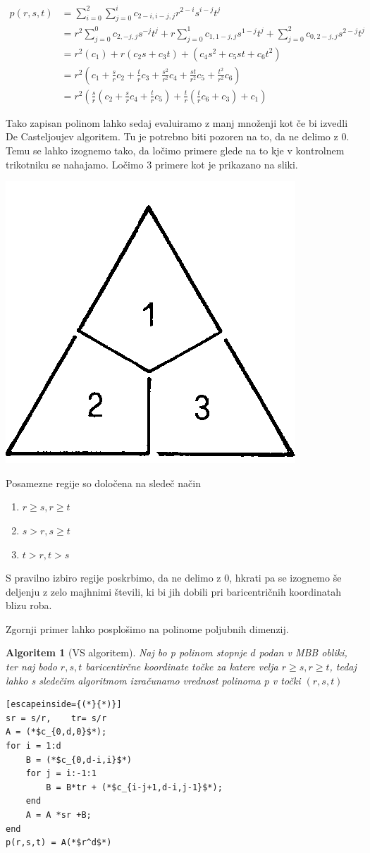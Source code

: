 \documentclass{article}
\newtheorem{algoritm}{Algoritem}[section]
\begin{document}
\begin{align}
p(r,s,t) &= \sum_{i=0}^{2}\sum_{j=0}^{i}c_{2-i,i-j,j}r^{2-i}s^{i-j}t^j \nonumber \\ \nonumber
&= r^2\sum_{j=0}^{0}c_{2,-j,j}s^{-j}t^j + r\sum_{j=0}^{1}c_{1,1-j,j}s^{1-j}t^j + \sum_{j=0}^{2}c_{0,2-j,j}s^{2-j}t^j \\ \nonumber
&= r^2(c_1) + r(c_2s+c_3t) + (c_4s^2+c_5st+c_6t^2)\\ \nonumber
&= r^2(c_1+\frac{s}{r}c_2+\frac{t}{r}c_3+\frac{s^2}{r^2}c_4+\frac{st}{r^2}c_5+\frac{t^2}{r^2}c_6) \\ \nonumber
&= r^2(\frac{s}{r}(c_2+\frac{s}{r}c_4+\frac{t}{r}c_5)+\frac{t}{r}(\frac{t}{r}c_6+c_3)+c_1) \nonumber
\end{align}

Tako zapisan polinom lahko sedaj evaluiramo z manj množenji kot če bi izvedli De Casteljoujev algoritem.
Tu je potrebno biti pozoren na to, da ne delimo z $0$. Temu se lahko izognemo tako, da ločimo primere glede na to kje v kontrolnem trikotniku se nahajamo. Ločimo $3$ primere kot je prikazano na sliki.

\begin{center}
\includegraphics[width=.3\linewidth]{graf1.png}
\end{center}
Posamezne regije so določena na sledeč način
\begin{enumerate}
\item  $r \geq s, r \geq t$
\item $s > r, s \geq t$
\item $t>r, t>s$
\end{enumerate}

S pravilno izbiro regije poskrbimo, da ne delimo z $0$, hkrati pa se izognemo še deljenju z zelo majhnimi števili, ki bi jih dobili pri baricentričnih koordinatah blizu roba.

Zgornji primer lahko posplošimo na polinome poljubnih dimenzij.

\begin{algoritm}[VS algoritem]
\label{MBB}
Naj bo p polinom stopnje $d$ podan v MBB obliki, ter naj bodo $ r,s,t$ baricentirčne koordinate točke za katere velja $r \geq s,r \geq t$, tedaj lahko s sledečim algoritmom izračunamo vrednost polinoma p v točki $(r,s,t)$
\begin{lstlisting}[escapeinside={(*}{*)}]
sr = s/r,	 tr= s/r
A = (*$c_{0,d,0}$*);
for i = 1:d
    B = (*$c_{0,d-i,i}$*)
    for j = i:-1:1
        B = B*tr + (*$c_{i-j+1,d-i,j-1}$*);
    end
    A = A *sr +B;
end
p(r,s,t) = A(*$r^d$*)
\end{lstlisting}
\end{algoritm}
\end{document}
